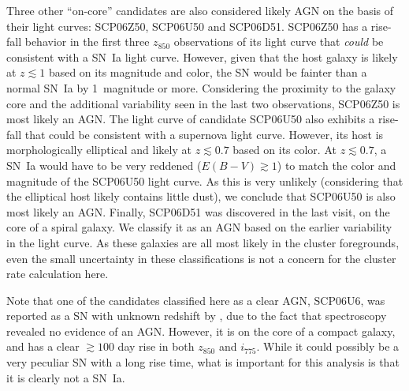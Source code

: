 Three other ``on-core'' candidates are also considered likely AGN on
the basis of their light curves: SCP06Z50, SCP06U50 and
SCP06D51. SCP06Z50 has a rise-fall behavior in the first three
$z_{850}$ observations of its light curve that \emph{could} be
consistent with a SN~Ia light curve. However, given that the host
galaxy is likely at $z \lesssim 1$ based on its magnitude and color,
the SN would be fainter than a normal SN~Ia by 1~magnitude or
more. Considering the proximity to the galaxy core and the additional
variability seen in the last two observations, SCP06Z50 is most likely
an AGN. The light curve of candidate SCP06U50 also exhibits a
rise-fall that could be consistent with a supernova light
curve. However, its host is morphologically elliptical and likely at
$z \lesssim 0.7$ based on its color. At $z \lesssim 0.7$, a SN~Ia
would have to be very reddened ($E(B-V) \gtrsim 1$) to match the color
and magnitude of the SCP06U50 light curve. As this is very unlikely
(considering that the elliptical host likely contains little dust), we
conclude that SCP06U50 is also most likely an AGN. Finally, SCP06D51
was discovered in the last visit, on the core of a spiral galaxy. We
classify it as an AGN based on the earlier variability in the light
curve. As these galaxies are all most likely in the cluster
foregrounds, even the small uncertainty in these classifications is
not a concern for the cluster rate calculation here.

Note that one of the candidates classified here as a clear AGN,
SCP06U6, was reported as a SN with unknown redshift by
\citet{dawson09a}, due to the fact that spectroscopy revealed no
evidence of an AGN.  However, it is on the core of a compact galaxy,
and has a clear $\gtrsim 100$ day rise in both $z_{850}$ and
$i_{775}$. While it could possibly be a very peculiar SN with a long
rise time, what is important for this analysis is that it is clearly
not a SN~Ia.


